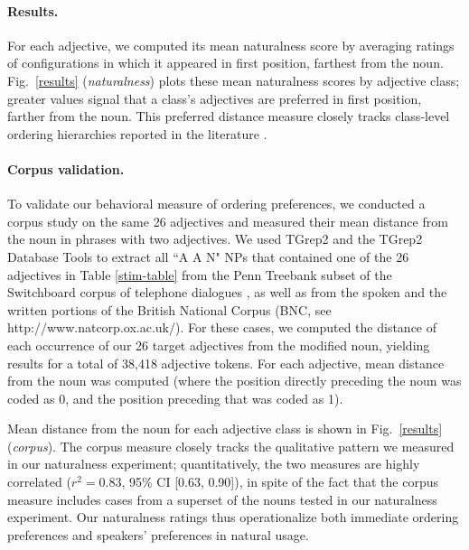 \documentclass[12pt]{article}
\begin{document}
\paragraph{Results.} For each adjective, we computed its mean naturalness score by averaging ratings of configurations in which it appeared in first position, farthest from the noun. Fig.\ \ref{results} (\emph{naturalness}) plots these mean naturalness scores by adjective class; greater values signal that a class's adjectives are preferred in first position, farther from 
the noun. This preferred distance measure closely tracks class-level ordering hierarchies reported in the literature \citep{dixon1982,Sproat1991}.

\paragraph{Corpus validation.} To validate our behavioral measure of ordering preferences, we conducted a corpus study on the same 26 adjectives and measured their mean distance from the noun in phrases with two adjectives. We used TGrep2 \citep{rohde2005} and the TGrep2 Database Tools \citep{Degen2011} to extract all ``A A N"  NPs that contained one of the 26 adjectives in Table \ref{stim-table} from the Penn Treebank subset of the Switchboard corpus of telephone dialogues \citep{godfrey1992}, as well as from the spoken and the written portions of the British National Corpus (BNC, see http://www.natcorp.ox.ac.uk/). For these cases, we computed the distance of each occurrence of our 26 target adjectives from the modified noun, yielding results for a total of 38,418 adjective tokens.  For each adjective, mean distance from the noun was computed (where the position directly preceding the noun was coded as 0, and the position preceding that was coded as 1). %

Mean distance from the noun for each adjective class is shown in Fig.~\ref{results} (\emph{corpus}).
The corpus measure closely tracks the qualitative pattern we measured in our naturalness experiment; quantitatively, the two measures are highly correlated ($r^{2}=0.83$, 95\% CI [0.63, 0.90]), in spite of the fact that the corpus measure includes cases from a superset of the nouns tested in our naturalness experiment. Our naturalness ratings thus operationalize both immediate ordering preferences and speakers' preferences in natural usage.
\end{document}
